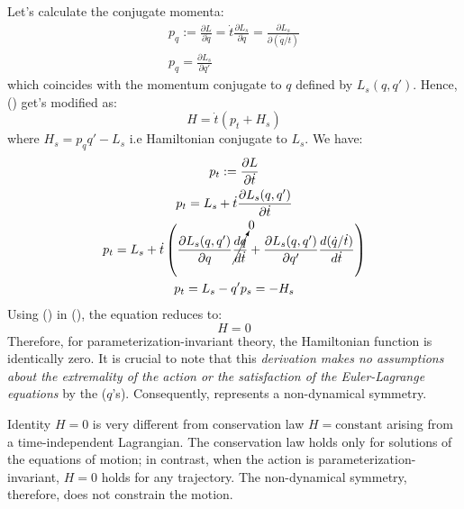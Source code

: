 Let's calculate the conjugate momenta:
\begin{equation}
	\begin{gathered}
		p_q := \frac{\partial L}{\partial\dot{q}}
		= \dot{t}\frac{\partial L_s}{\partial\dot{q}}
		=\frac{\partial L_s}{\partial(\dot{q}/ \dot{t})}\\
		p_q = \frac{\partial L_s}{\partial q'}
	\end{gathered}
\end{equation}
which coincides with the momentum conjugate to $q$ defined by $L_s(q, q′)$. Hence, () get's modified as:
\begin{equation}
	\label{eq:hamil_contrain_Hs}
	H  = \dot{t} \left(p_t + H_s\right)
\end{equation}
where \(H_s = p_q q'- L_s\) i.e Hamiltonian conjugate to \(L_s\).
We have:
\begin{equation}
	\label{eq:conh_pt}
	\begin{gathered}
		p_t := \frac{\partial L}{\partial\dot{t}}\\
		p_t = L_s + \dot{t} \frac{\partial L_s(q, q')}{\partial\dot{t}}\\
		p_t = L_s + \dot{t} \left(\frac{\partial L_s(q, q')}{\partial q} \cancelto{0}{\frac{d q}{d \dot{t}}} +
		\frac{\partial L_s(q, q')}{\partial q'} \frac{d (\dot{q}/\dot{t})}{d \dot{t}}
		\right) \\
		p_t = L_s - q'p_s = - H_s
	\end{gathered}
\end{equation}
Using () in (), the equation reduces to:
\begin{equation}
	\label{eq:H0}
	\boxed{H = 0}
\end{equation}
Therefore, for parameterization-invariant theory, the Hamiltonian function 
is identically zero. It is crucial to note that this \emph{derivation makes no 
assumptions about the extremality of the action or the satisfaction of the 
Euler-Lagrange equations} by the ($q$'s). Consequently, 
represents a non-dynamical symmetry.

Identity $H = 0$ is very different from conservation law $H = \mathrm{constant}$ arising
from a time-independent Lagrangian. The conservation law holds only for solutions of the
equations of motion; in contrast, when the action is parameterization-invariant, 
$H = 0$ holds for any trajectory. The non-dynamical symmetry, therefore, does not
constrain the motion.